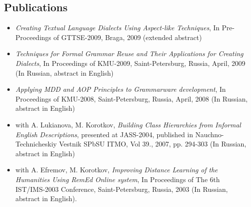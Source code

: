 \documentclass[a4paper, 12pt]{article}
\begin{document}
\subsection*{Publications}
\begin{itemize}
	\item {\it Creating Textual Language Dialects Using Aspect-like Techniques}, In Pre-Proceedings of GTTSE-2009, Braga, 2009 (extended abstract)
	\item {\it Techniques for Formal Grammar Reuse and Their Applications for Creating Dialects}, In Proceedings of KMU-2009, Saint-Petersburg, Russia, April, 2009 (In Russian, abstract in English)
	\item {\it Applying MDD and AOP Principles to Grammarware development}, In Proceedings of KMU-2008, Saint-Petersburg, Russia, April, 2008 (In Russian, abstract in English)
	\item with A. Lukianova, M. Korotkov, {\it Building Class Hierarchies from Informal English Descriptions}, presented at JASS-2004, published in Nauchno-Technicheskiy Vestnik SPbSU ITMO, Vol 39., 2007, pp. 294-303 (In Russian, abstract in English)
	\item with A. Efremov, M. Korotkov, {\it Improving Distance Learning of the Humanities Using {\it RemEd} Online system}, In Proceedings of The 6th IST/IMS-2003 Conference, Saint-Petersburg, Russia, 2003 (In Russian, abstract in English).
\end{itemize}
\end{document}
